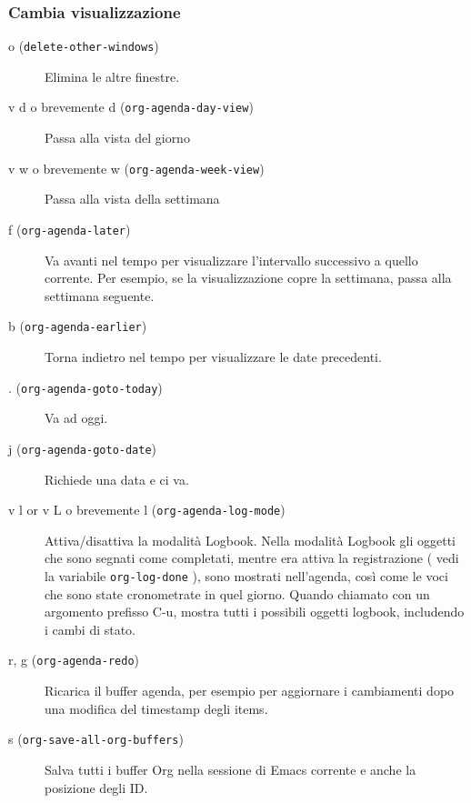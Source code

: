 \documentclass[11pt]{article}
\begin{document}
\subsubsection*{Cambia visualizzazione}
\label{sec:org4be8802}
\begin{description}
\item[{o (\texttt{delete-other-windows})}] Elimina le altre finestre.

\item[{v d o brevemente d (\texttt{org-agenda-day-view})}] Passa alla vista del giorno

\item[{v w o brevemente w (\texttt{org-agenda-week-view})}] Passa alla vista della settimana

\item[{f (\texttt{org-agenda-later})}] Va avanti nel tempo per visualizzare l'intervallo successivo a
quello corrente. Per esempio, se la visualizzazione copre la
settimana, passa alla settimana seguente.

\item[{b (\texttt{org-agenda-earlier})}] Torna indietro nel tempo per visualizzare le date precedenti.

\item[{. (\texttt{org-agenda-goto-today})}] Va ad oggi.

\item[{j (\texttt{org-agenda-goto-date})}] Richiede una data e ci va.

\item[{v l or v L o brevemente l (\texttt{org-agenda-log-mode})}] Attiva/disattiva la modalità Logbook. Nella modalità Logbook gli
oggetti che sono segnati come completati, mentre era attiva la
registrazione ( vedi la variabile \texttt{org-log-done} ), sono mostrati
nell'agenda, così come le voci che sono state cronometrate in quel
giorno. Quando chiamato con un argomento prefisso C-u,
mostra tutti i possibili oggetti logbook, includendo i cambi di
stato.

\item[{r, g (\texttt{org-agenda-redo})}] Ricarica il buffer agenda, per esempio per aggiornare i cambiamenti
dopo una modifica del timestamp degli items.

\item[{s (\texttt{org-save-all-org-buffers})}] Salva tutti i buffer Org nella sessione di Emacs corrente e anche la
posizione degli ID.
\end{description}
\end{document}
